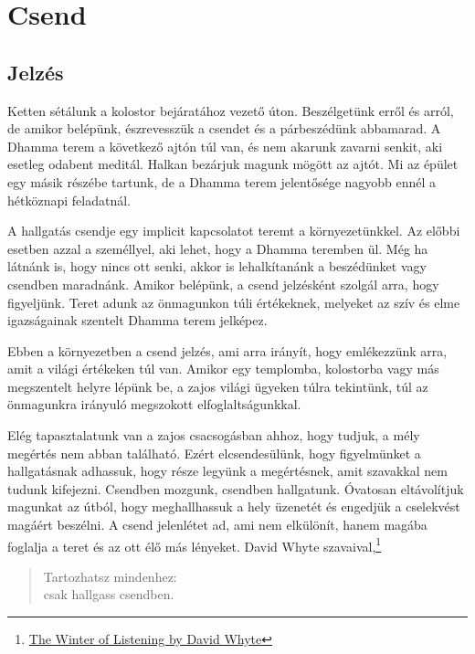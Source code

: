 \chapter{Csend}

\section{Jelzés}


\noindent Ketten sétálunk a kolostor bejáratához vezető úton.
Beszélgetünk erről és arról, de amikor belépünk, észrevesszük a csendet
és a párbeszédünk abbamarad. A Dhamma terem a következő ajtón túl van,
és nem akarunk zavarni senkit, aki esetleg odabent meditál. Halkan
bezárjuk magunk mögött az ajtót. Mi az épület egy másik részébe tartunk,
de a Dhamma terem jelentősége nagyobb ennél a hétköznapi feladatnál.

A hallgatás csendje egy implicit kapcsolatot teremt a környezetünkkel.
Az előbbi esetben azzal a személlyel, aki lehet, hogy a Dhamma teremben
ül. Még ha látnánk is, hogy nincs ott senki, akkor is lehalkítanánk a
beszédünket vagy csendben maradnánk. Amikor belépünk, a csend jelzésként
szolgál arra, hogy figyeljünk. Teret adunk az önmagunkon túli
értékeknek, melyeket az szív és elme igazságainak szentelt Dhamma terem
jelképez.

Ebben a környezetben a csend jelzés, ami arra irányít, hogy emlékezzünk
arra, amit a világi értékeken túl van. Amikor egy templomba, kolostorba
vagy más megszentelt helyre lépünk be, a zajos világi ügyeken túlra
tekintünk, túl az önmagunkra irányuló megszokott elfoglaltságunkkal.

Elég tapasztalatunk van a zajos csacsogásban ahhoz, hogy tudjuk, a mély
megértés nem abban található. Ezért elcsendesülünk, hogy figyelmünket a
hallgatásnak adhassuk, hogy része legyünk a megértésnek, amit szavakkal
nem tudunk kifejezni. Csendben mozgunk, csendben hallgatunk. Óvatosan
eltávolítjuk magunkat az útból, hogy meghallhassuk a hely üzenetét és
engedjük a cselekvést magáért beszélni. A csend jelenlétet ad, ami nem
elkülönít, hanem magába foglalja a teret és az ott élő más lényeket.
David Whyte szavaival,\footnote{\href{https://www.goodreads.com/quotes/10119971-the-winter-of-listening-no-one-but-me-by-the}{The
  Winter of Listening by David Whyte}}

\begin{quote}
Tartozhatsz mindenhez:\\
csak hallgass csendben.
\end{quote}

